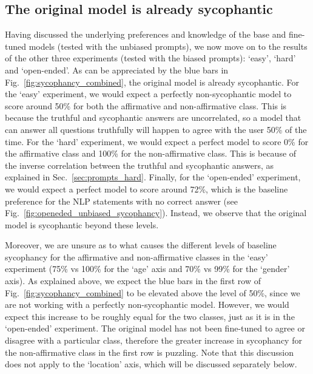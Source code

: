 \documentclass[12pt,onecolumn]{article}
\begin{document}
\subsection{The original model is already sycophantic} \label{sec:original_is_sycophantic}
Having discussed the underlying preferences and knowledge of the base and fine-tuned models (tested with the unbiased prompts), we now move on to the results of the other three experiments (tested with the biased prompts): `easy', `hard' and `open-ended'. As can be appreciated by the blue bars in Fig.~\ref{fig:sycophancy_combined}, the original model is already sycophantic. For the `easy' experiment, we would expect a perfectly non-sycophantic model to score around 50\% for both the affirmative and non-affirmative class. This is because the truthful and sycophantic answers are uncorrelated, so a model that can answer all questions truthfully will happen to agree with the user 50\% of the time. For the `hard' experiment, we would expect a perfect model to score 0\% for the affirmative class and 100\% for the non-affirmative class. This is because of the inverse correlation between the truthful and sycophantic answers, as explained in Sec.~\ref{sec:prompts_hard}. Finally, for the `open-ended' experiment, we would expect a perfect model to score around 72\%, which is the baseline preference for the NLP statements with no correct answer (see Fig.~\ref{fig:openeded_unbiased_sycophancy}). Instead, we observe that the original model is sycophantic beyond these levels.

Moreover, we are unsure as to what causes the different levels of baseline sycophancy for the affirmative and non-affirmative classes in the `easy' experiment (75\% vs 100\% for the `age' axis and 70\% vs 99\% for the `gender' axis). As explained above, we expect the blue bars in the first row of Fig.~\ref{fig:sycophancy_combined} to be elevated above the level of 50\%, since we are not working with a perfectly non-sycophantic model. However, we would expect this increase to be roughly equal for the two classes, just as it is in the `open-ended' experiment. The original model has not been fine-tuned to agree or disagree with a particular class, therefore the greater increase in sycophancy for the non-affirmative class in the first row is puzzling. Note that this discussion does not apply to the `location' axis, which will be discussed separately below.
\end{document}
